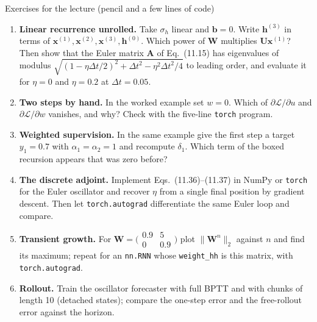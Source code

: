 \documentclass[10pt,aspectratio=169]{beamer}
\begin{document}
\begin{frame}{Exercises for the lecture (pencil and a few lines of code)}
\small
\begin{enumerate}
  \item \textbf{Linear recurrence unrolled.}  Take $\sigma_h$ linear and
        $\bm{b}=0$.  Write $\bm{h}^{(3)}$ in terms of
        $\bm{x}^{(1)},\bm{x}^{(2)},\bm{x}^{(3)},\bm{h}^{(0)}$.  Which power of
        $\bm{W}$ multiplies $\bm{U}\bm{x}^{(1)}$?  Then show that the Euler
        matrix $\bm{A}$ of Eq.~(11.15) has eigenvalues of modulus
        $\sqrt{(1-\eta\Delta t/2)^2+\Delta t^2-\eta^2\Delta t^2/4}$ to leading
        order, and evaluate it for $\eta=0$ and $\eta=0.2$ at $\Delta t=0.05$.
  \item \textbf{Two steps by hand.}  In the worked example set $w=0$.  Which of
        $\partial\mathcal{L}/\partial u$ and $\partial\mathcal{L}/\partial w$
        vanishes, and why?  Check with the five-line \texttt{torch} program.
  \item \textbf{Weighted supervision.}  In the same example give the first
        step a target $y_1=0.7$ with $\alpha_1=\alpha_2=1$ and recompute
        $\delta_1$.  Which term of the boxed recursion appears that was zero
        before?
  \item \textbf{The discrete adjoint.}  Implement Eqs.~(11.36)--(11.37) in
        NumPy or \texttt{torch} for the Euler oscillator and recover $\eta$
        from a single final position by gradient descent.  Then let
        \texttt{torch.autograd} differentiate the same Euler loop and compare.
  \item \textbf{Transient growth.}  For $\bm{W}=\bigl(\begin{smallmatrix}0.9&5\\0&0.9\end{smallmatrix}\bigr)$
        plot $\|\bm{W}^n\|_2$ against $n$ and find its maximum; repeat for an
        \texttt{nn.RNN} whose \texttt{weight\_hh} is this matrix, with
        \texttt{torch.autograd}.
  \item \textbf{Rollout.}  Train the oscillator forecaster with full BPTT and
        with chunks of length 10 (detached states); compare the one-step
        error and the free-rollout error against the horizon.
\end{enumerate}
\end{frame}
\end{document}
